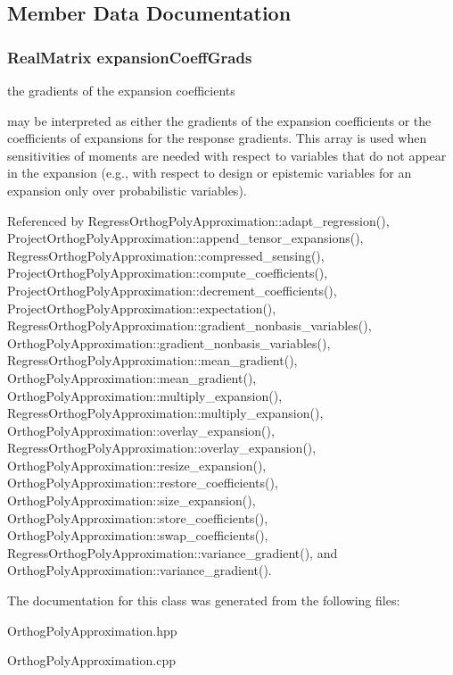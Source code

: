 \subsection{Member Data Documentation}
\subsubsection[{\texorpdfstring{expansion\+Coeff\+Grads}{expansionCoeffGrads}}]{\setlength{\rightskip}{0pt plus 5cm}Real\+Matrix expansion\+Coeff\+Grads\hspace{0.3cm}{\ttfamily [protected]}}\label{classPecos_1_1OrthogPolyApproximation_aafa9e6fb757964c3ce070ae4f980b6af}


the gradients of the expansion coefficients 

may be interpreted as either the gradients of the expansion coefficients or the coefficients of expansions for the response gradients. This array is used when sensitivities of moments are needed with respect to variables that do not appear in the expansion (e.\+g., with respect to design or epistemic variables for an expansion only over probabilistic variables). 

Referenced by Regress\+Orthog\+Poly\+Approximation\+::adapt\+\_\+regression(), Project\+Orthog\+Poly\+Approximation\+::append\+\_\+tensor\+\_\+expansions(), Regress\+Orthog\+Poly\+Approximation\+::compressed\+\_\+sensing(), Project\+Orthog\+Poly\+Approximation\+::compute\+\_\+coefficients(), Project\+Orthog\+Poly\+Approximation\+::decrement\+\_\+coefficients(), Project\+Orthog\+Poly\+Approximation\+::expectation(), Regress\+Orthog\+Poly\+Approximation\+::gradient\+\_\+nonbasis\+\_\+variables(), Orthog\+Poly\+Approximation\+::gradient\+\_\+nonbasis\+\_\+variables(), Regress\+Orthog\+Poly\+Approximation\+::mean\+\_\+gradient(), Orthog\+Poly\+Approximation\+::mean\+\_\+gradient(), Orthog\+Poly\+Approximation\+::multiply\+\_\+expansion(), Regress\+Orthog\+Poly\+Approximation\+::multiply\+\_\+expansion(), Orthog\+Poly\+Approximation\+::overlay\+\_\+expansion(), Regress\+Orthog\+Poly\+Approximation\+::overlay\+\_\+expansion(), Orthog\+Poly\+Approximation\+::resize\+\_\+expansion(), Orthog\+Poly\+Approximation\+::restore\+\_\+coefficients(), Orthog\+Poly\+Approximation\+::size\+\_\+expansion(), Orthog\+Poly\+Approximation\+::store\+\_\+coefficients(), Orthog\+Poly\+Approximation\+::swap\+\_\+coefficients(), Regress\+Orthog\+Poly\+Approximation\+::variance\+\_\+gradient(), and Orthog\+Poly\+Approximation\+::variance\+\_\+gradient().



The documentation for this class was generated from the following files\+:\begin{DoxyCompactItemize}
\item 
Orthog\+Poly\+Approximation.\+hpp\item 
Orthog\+Poly\+Approximation.\+cpp\end{DoxyCompactItemize}
